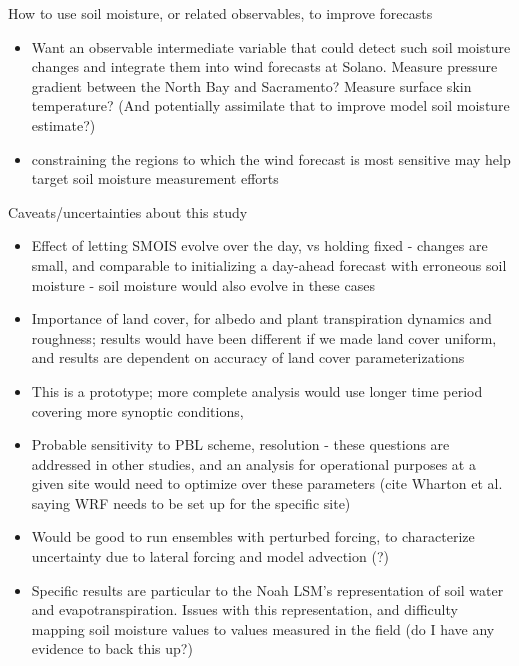 How to use soil moisture, or related observables, to improve forecasts
\begin{itemize}
\item Want an observable intermediate variable that could detect such soil moisture changes and integrate them into wind forecasts at Solano.  Measure pressure gradient between the North Bay and Sacramento?  Measure surface skin temperature?  (And potentially assimilate that to improve model soil moisture estimate?)
\item constraining the regions to which the wind forecast is most sensitive may help target soil moisture measurement efforts
\end{itemize}

Caveats/uncertainties about this study
\begin{itemize}
\item Effect of letting SMOIS evolve over the day, vs holding fixed - changes are small, and comparable to initializing a day-ahead forecast with erroneous soil moisture - soil moisture would also evolve in these cases
\item Importance of land cover, for albedo and plant transpiration dynamics and roughness; results would have been different if we made land cover uniform, and results are dependent on accuracy of land cover parameterizations
\item This is a prototype; more complete analysis would use longer time period covering more synoptic conditions, 
\item Probable sensitivity to PBL scheme, resolution - these questions are addressed in other studies, and an analysis for operational purposes at a given site would need to optimize over these parameters (cite Wharton et al. saying WRF needs to be set up for the specific site)
\item Would be good to run ensembles with perturbed forcing, to characterize uncertainty due to lateral forcing and model advection (?)
\item Specific results are particular to the Noah LSM's representation of soil water and evapotranspiration.  Issues with this representation, and difficulty mapping soil moisture values to values measured in the field (do I have any evidence to back this up?)
\end{itemize}


